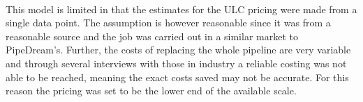 \documentclass[11pt]{article}		%
\newcommand{\supercite}[1]{\textsuperscript{\cite{#1}}}		%
\begin{document}
	           \\ \hspace*{3ex}
	           This model is limited in that the estimates for the ULC pricing were made from a single data point. The assumption is however reasonable since it was from a reasonable source and the job was carried out in a similar market to PipeDream’s. Further, the costs of replacing the whole pipeline are very variable and through several interviews with those in industry a reliable costing was not able to be reached, meaning the exact costs saved may not be accurate. For this reason the pricing was set to be the lower end of the available scale.	
            	            \\
            	            
\end{document}

